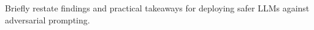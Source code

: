 Briefly restate findings and practical takeaways for deploying safer LLMs against adversarial prompting.
